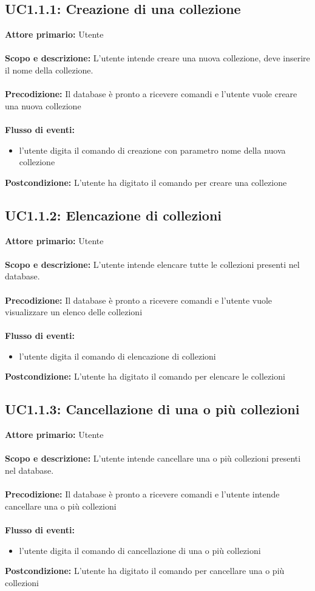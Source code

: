\documentclass{scalatekids-article}
\begin{document}
\subsection{UC1.1.1: Creazione di una collezione}
\textbf{Attore primario:} Utente\\ \\
\textbf{Scopo e descrizione:} L’utente intende creare una nuova collezione, deve inserire il nome della collezione.\\ \\
\textbf{Precodizione:} Il database è pronto a ricevere comandi e l’utente vuole creare una nuova collezione\\ \\
\textbf{Flusso di eventi:}
\begin{itemize}
\item l'utente digita il comando di creazione con parametro nome della nuova collezione
\end{itemize}
\textbf{Postcondizione:} L'utente ha digitato il comando per creare una collezione
\subsection{UC1.1.2: Elencazione di collezioni}
\textbf{Attore primario:} Utente\\ \\
\textbf{Scopo e descrizione:} L’utente intende elencare tutte le collezioni presenti nel database.\\ \\
\textbf{Precodizione:} Il database è pronto a ricevere comandi e l’utente vuole visualizzare un elenco delle collezioni\\ \\
\textbf{Flusso di eventi:}
\begin{itemize}
\item l'utente digita il comando di elencazione di collezioni
\end{itemize}
\textbf{Postcondizione:} L'utente ha digitato il comando per elencare le collezioni
\subsection{UC1.1.3: Cancellazione di una o più collezioni}
\textbf{Attore primario:} Utente\\ \\
\textbf{Scopo e descrizione:} L’utente intende cancellare una o più collezioni presenti nel database.\\ \\
\textbf{Precodizione:} Il database è pronto a ricevere comandi e l’utente intende cancellare una o più collezioni\\ \\
\textbf{Flusso di eventi:}
\begin{itemize}
\item l'utente digita il comando di cancellazione di una o più collezioni
\end{itemize}
\textbf{Postcondizione:} L’utente ha digitato il comando per cancellare una o più collezioni
\end{document}
